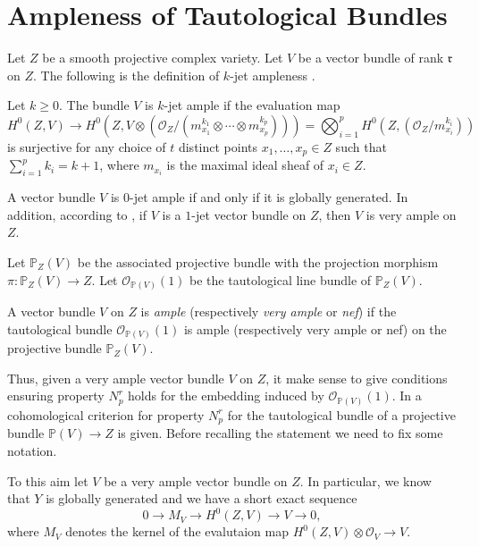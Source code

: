 \documentclass[11pt,letter]{amsart}
\numberwithin{equation}{section}
\begin{document}
\section{Ampleness of Tautological Bundles}\label{sec3}





Let $Z$ be a smooth projective complex variety. Let $V$ be a vector bundle of rank $\mathfrak{r}$ on $Z$. The following is the definition of $k$-jet ampleness \cite[\S 1.2]{BDS}.

\begin{defi}
Let $k\geq 0$. The bundle $V$ is $k$-jet ample if the evaluation map 
\[
H^0(Z,V)\rightarrow H^0(Z,V\otimes (\mathcal{O}_Z/(m_{x_1}^{k_1}\otimes \cdots\otimes m_{x_p}^{k_p})))=\bigotimes_{i=1}^pH^0(Z,(\mathcal{O}_Z/m_{x_i}^{k_i}))
\]
is surjective for any choice of $t$ distinct points $x_1,\ldots,x_p\in Z$ such that $\sum_{i=1}^pk_i=k+1$, where $m_{x_i}$ is the maximal ideal sheaf of $x_i\in Z$.
\end{defi}

A vector bundle $V$ is $0$-jet ample if and only if it is globally generated. In addition, according to \cite[Theorem 4.2]{BUP}, if $V$ is a $1$-jet vector bundle on $Z$, then $V$ is very ample on $Z$.

Let $\mathbb{P}_Z(V)$ be the associated projective bundle with the projection morphism $\pi:\mathbb{P}_Z(V)\rightarrow Z$. Let $\mathcal{O}_{\mathbb{P}(V)}(1)$ be the tautological line bundle of $\mathbb{P}_Z(V)$.


\begin{defi} 
A vector bundle $V$ on $Z$ is \emph{ample} (respectively \emph{very ample} or \emph{nef}) if the tautological bundle $\mathcal{O}_{\mathbb{P}(V)}(1)$ is ample (respectively very ample or nef) on the projective bundle $\mathbb{P}_Z(V)$. 
\end{defi}
Thus, given a very ample vector bundle $V$ on $Z$, it make sense to give conditions ensuring property $N_p^r$ holds for the embedding induced by $\mathcal{O}_{\mathbb{P}(V)}(1)$. In \cite{Park} a cohomological criterion for property $N_p^r$ for the tautological bundle of a projective bundle $\mathbb{P}(V)\rightarrow Z$ is given. Before recalling the statement we need to fix some notation.\par
To this aim let $V$ be a very ample vector bundle on $Z$. In particular, we know that $Y$ is globally generated and we have a short exact sequence
\[ 0\rightarrow M_{V}\longrightarrow H^0(Z, V)\longrightarrow V\rightarrow 0,\]
where $M_V$ denotes the kernel of the evalutaion map $H^0(Z,V)\otimes\mathcal{O}_V\rightarrow V$.
\end{document}
